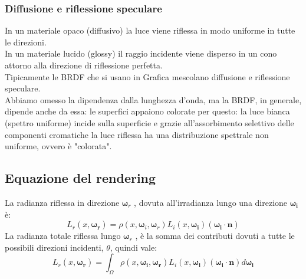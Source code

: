 \documentclass[a4paper, 10pt]{article}
\renewcommand{\vec}{\bm}
\begin{document}
		\subsubsection{Diffusione e riflessione speculare}
			In un materiale opaco (diffusivo) la luce viene riflessa in modo uniforme
			in tutte le direzioni. \\
			In un materiale lucido (glossy) il raggio incidente viene disperso in un cono attorno alla direzione di riflessione perfetta.\\
			Tipicamente le BRDF che si usano in Grafica mescolano
			diffusione e riflessione speculare.\\
			Abbiamo omesso la dipendenza dalla lunghezza d’onda, ma la
			BRDF, in generale, dipende anche da essa: le superfici appaiono
			colorate per questo: la luce bianca (spettro uniforme) incide
			sulla superficie e grazie all’assorbimento selettivo delle
			componenti cromatiche la luce riflessa ha una distribuzione
			spettrale non uniforme, ovvero è "colorata".\\
		
	\subsection{Equazione del rendering}
		La radianza riflessa in direzione $ \vec{\omega}_r $ , dovuta all'irradianza lungo
		una direzione $ \vec{\omega_i} $ è:
		\[
			L_r(x, \vec{\omega_r}) = \rho(x,\vec{\omega}_i, \vec{\omega}_r)L_i (x, \vec{\omega_i} )(\vec{\omega_i} \cdot \vec{n})
		\]
		La radianza totale riflessa lungo $ \vec{\omega}_r $ , è la somma dei contributi
		dovuti a tutte le possibili direzioni incidenti, $ \theta $, quindi vale:
		\[
			L_r(x, \vec{\omega_r}) = \int_{\Omega} \rho(x, \vec{\omega_i}, \vec{\omega_r}) 
			L_i (x, \vec{\omega_i} )(\vec{\omega_i} \cdot \vec{n}) d\vec{\omega_i}
		\]
		
\end{document}
